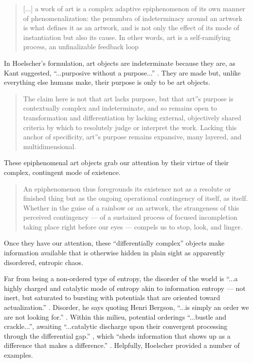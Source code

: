                 \begin{quote}
                    [...] a work of art is a complex adaptive epiphenomenon of its own manner of phenomenalization: the penumbra of indeterminacy around an artwork is what defines it as an artwork, and is not only the effect of its mode of instantiation but also its cause. In other words, art is a self-ramifying process, an unfinalizable feedback loop \citep[p.2]{HoelscherThPtcsOfPhsSpc2014}
                \end{quote}

                In Hoelscher's formulation, art objects are indeterminate because they are, as Kant suggested, “...purposive without a purpose...” \citep[p.57]{KantCrtqOfJdgmnt}. They are made but, unlike everything else humans make, their purpose is only to be art objects. 

                \begin{quote}
                    The claim here is not that art lacks purpose, but that art”s purpose is contextually complex and indeterminate, and so remains open to transformation and differentiation by lacking external, objectively shared criteria by which to resolutely judge or interpret the work. Lacking this anchor of specificity, art”s purpose remains expansive, many layered, and multidimensional.\citep[p.25]{HoelscherThPtcsOfPhsSpc2014}
                \end{quote}

                These epiphenomenal art objects grab our attention by their virtue of their complex, contingent mode of existence.

                \begin{quote}
                    An epiphenomenon thus foregrounds its existence not as a resolute or finished thing but as the ongoing operational contingency of itself, as itself. Whether in the guise of a rainbow or an artwork, the strangeness of this perceived contingency — of a sustained process of focused incompletion taking place right before our eyes — compels us to stop, look, and linger.
                \end{quote}

                Once they have our attention, these “differentially complex” \citep[p.74]{HoelscherArtAsInfrmtn2021} objects make information available that is otherwise hidden in plain sight as apparently disordered, entropic chaos.
                
                Far from being a non-ordered type of entropy, the disorder of the world is “...a highly charged and catalytic mode of entropy akin to information entropy — not inert, but saturated to bursting with potentials that are oriented toward actualization.” \citep[p.72]{HoelscherArtAsInfrmtn2021}. Disorder, he says quoting Henri Bergson, “...is simply an order we are not looking for.” \citep[p.73]{HoelscherArtAsInfrmtn2021}. Within this milieu, potential orderings “...bustle and crackle...”, awaiting “...catalytic discharge upon their convergent processing through the differential gap.” \citep[p.73]{HoelscherArtAsInfrmtn2021}, which “sheds information that shows up as a difference that makes a difference.” \citep[p.75]{HoelscherArtAsInfrmtn2021}. Helpfully, Hoelscher provided a number of examples.

